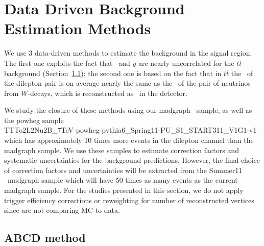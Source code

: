 \section{Data Driven Background Estimation Methods}
\label{sec:datadriven}
We use 3 data-driven methods to 
estimate the background in the signal region.
The first one exploits the fact that 
\Ht\ and $y$ are nearly 
uncorrelated for the $t\bar{t}$ background 
(Section~\ref{sec:abcd});  the second one 
is based on the fact that in $t\bar{t}$ the
\pt\ of the dilepton pair is on average 
nearly the same as the \pt\ of the pair of neutrinos
from $W$-decays, which is reconstructed as \met\ in the
detector.

We study the closure of these methods using our madgraph \ttbar\ sample, as well as 
the powheg sample \\
TTTo2L2Nu2B\_7TeV-powheg-pythia6\_Spring11-PU\_S1\_START311\_V1G1-v1
which has approximately 10 times more events in the dilepton channel than the madgraph sample.
We use these samples to estimate correction factors and systematic uncertainties for the background predictions. 
However, the final choice of correction factors and uncertainties will be extracted from the Summer11 \ttbar\ madgraph
sample which will have 50 times as many events as the current madgraph sample. 
For the studies presented in this section, we do not apply trigger efficiency corrections or reweighting for
number of reconstructed vertices since are not comparing MC to data. 

\subsection{ABCD method}
\label{sec:abcd}


